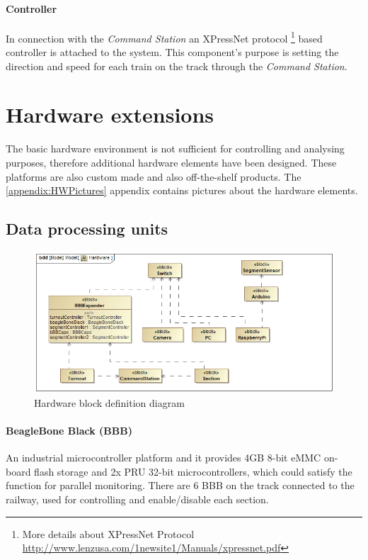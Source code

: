\paragraph{Controller}
In connection with the \textit{Command Station} an XPressNet protocol \footnote{More details about XPressNet Protocol \url{http://www.lenzusa.com/1newsite1/Manuals/xpressnet.pdf}} based controller is attached to the system. This component's purpose is setting the direction and speed for each train on the track through the \textit{Command Station}.

\section{Hardware extensions}
The basic hardware environment is not sufficient for controlling and analysing purposes, therefore additional hardware elements have been designed. These platforms are also custom made and also off-the-shelf products. 
The \ref{appendix:HWPictures} appendix contains pictures about the hardware elements.
\subsection{Data processing units}

\begin{figure}[h]
	\centering
	\includegraphics[width=150mm]{figures/modes3/Hardware.png}
	\caption{Hardware block definition diagram}
	\label{fig:Modes3HWBDD}
\end{figure}
\paragraph{BeagleBone Black (BBB)}
An industrial microcontroller platform and it provides 4GB 8-bit eMMC on-board flash storage and 2x PRU 32-bit microcontrollers, which could satisfy the function for parallel monitoring. There are 6 BBB on the track connected to the railway, used for controlling and enable/disable each section.

